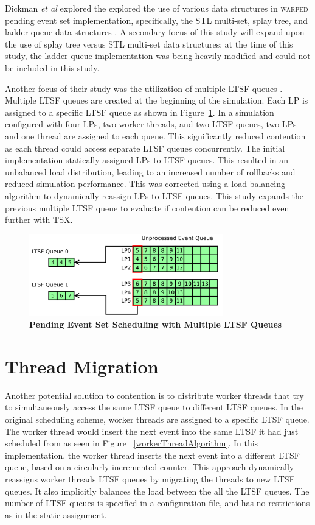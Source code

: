 \documentclass[11pt]{book}
\begin{document}
Dickman \emph{et al} explored the explored the use of various data structures in \textsc{warped}
pending event set implementation, specifically, the STL multi-set, splay tree, and ladder
queue data structures \cite{dickman}.  A secondary focus of this study will expand upon
the use of splay tree versus STL multi-set data structures; at the time of this study, the
ladder queue implementation was being heavily modified and could not be included in this
study.

Another focus of their study was the utilization of multiple LTSF queues \cite{dickman}.
Multiple LTSF queues are created at the beginning of the simulation.  Each LP is assigned
to a specific LTSF queue as shown in Figure~\ref{fig:multipleLTSF}.  In a simulation
configured with four LPs, two worker threads, and two LTSF queues, two LPs and one thread
are assigned to each queue.  This significantly reduced contention as each thread could
access separate LTSF queues concurrently.  The initial implementation statically assigned
LPs to LTSF queues.  This resulted in an unbalanced load distribution, leading to an
increased number of rollbacks and reduced simulation performance.  This was corrected
using a load balancing algorithm to dynamically reassign LPs to LTSF queues.  This study
expands the previous multiple LTSF queue to evaluate if contention can be reduced even
further with TSX.

\begin{figure}[H]
    \centering
    \graphicspath{ {./figures/} }
    \includegraphics[width=0.75\textwidth,keepaspectratio]{multiple_ltsf}
    \caption{\textbf{Pending Event Set Scheduling with Multiple LTSF Queues}}
    \label{fig:multipleLTSF}
\end{figure}

\section{Thread Migration}

Another potential solution to contention is to distribute worker threads that
try to simultaneously access the same LTSF queue to different LTSF queues.  In
the original scheduling scheme, worker threads are assigned to a specific LTSF
queue.  The worker thread would insert the next event into the same LTSF it had
just scheduled from as seen in Figure ~\ref{workerThreadAlgorithm}.  In this
implementation, the worker thread inserts the next event into a different LTSF
queue, based on a circularly incremented counter.  This approach dynamically
reassigns worker threads LTSF queues by migrating the threads to new LTSF
queues.  It also implicitly balances the load between the all the LTSF queues.
The number of LTSF queues is specified in a configuration file, and has no
restrictions as in the static assignment.
\end{document}
